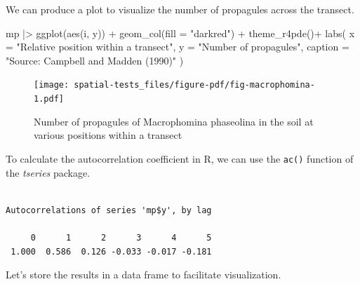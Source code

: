 \documentclass[
  letterpaper,
]{book}
\newenvironment{Shaded}{\begin{snugshade}}{\end{snugshade}}
\newcommand{\AttributeTok}[1]{\textcolor[rgb]{0.40,0.45,0.13}{#1}}
\newcommand{\ConstantTok}[1]{\textcolor[rgb]{0.56,0.35,0.01}{#1}}
\newcommand{\DecValTok}[1]{\textcolor[rgb]{0.68,0.00,0.00}{#1}}
\newcommand{\FunctionTok}[1]{\textcolor[rgb]{0.28,0.35,0.67}{#1}}
\newcommand{\NormalTok}[1]{\textcolor[rgb]{0.00,0.23,0.31}{#1}}
\newcommand{\OtherTok}[1]{\textcolor[rgb]{0.00,0.23,0.31}{#1}}
\newcommand{\SpecialCharTok}[1]{\textcolor[rgb]{0.37,0.37,0.37}{#1}}
\newcommand{\StringTok}[1]{\textcolor[rgb]{0.13,0.47,0.30}{#1}}
\begin{document}
We can produce a plot to visualize the number of propagules across the
transect.

\begin{Shaded}
\begin{Highlighting}[]
\NormalTok{mp }\SpecialCharTok{|\textgreater{}}
  \FunctionTok{ggplot}\NormalTok{(}\FunctionTok{aes}\NormalTok{(i, y)) }\SpecialCharTok{+}
  \FunctionTok{geom\_col}\NormalTok{(}\AttributeTok{fill =} \StringTok{"darkred"}\NormalTok{) }\SpecialCharTok{+}
  \FunctionTok{theme\_r4pde}\NormalTok{()}\SpecialCharTok{+}
  \FunctionTok{labs}\NormalTok{(}
    \AttributeTok{x =} \StringTok{"Relative position within a transect"}\NormalTok{,}
    \AttributeTok{y =} \StringTok{"Number of propagules"}\NormalTok{,}
    \AttributeTok{caption =} \StringTok{"Source: Campbell and Madden (1990)"}
\NormalTok{  )}
\end{Highlighting}
\end{Shaded}

\begin{figure}[H]

\texttt{[image: spatial-tests\_files/figure-pdf/fig-macrophomina-1.pdf]} \hfill{}

\caption{\label{fig-macrophomina}Number of propagules of Macrophomina
phaseolina in the soil at various positions within a transect}

\end{figure}

To calculate the autocorrelation coefficient in R, we can use the
\texttt{ac()} function of the \emph{tseries} package.

\begin{Shaded}
\end{Shaded}

\begin{verbatim}

Autocorrelations of series 'mp$y', by lag

     0      1      2      3      4      5 
 1.000  0.586  0.126 -0.033 -0.017 -0.181 
\end{verbatim}

Let's store the results in a data frame to facilitate visualization.
\end{document}
